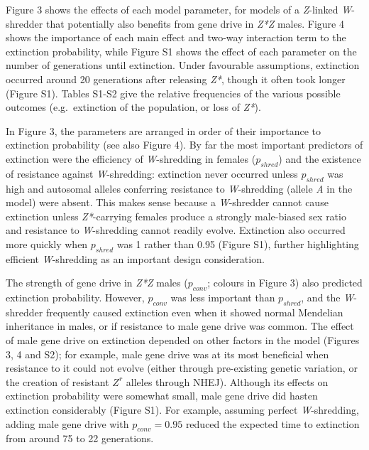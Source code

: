 \documentclass[]{rsos}%
\begin{document}
Figure 3 shows the effects of each model parameter, for models of a
\emph{Z}-linked \emph{W}-shredder that potentially also benefits from
gene drive in \emph{Z*Z} males. Figure 4 shows the importance of each
main effect and two-way interaction term to the extinction probability,
while Figure S1 shows the effect of each parameter on the number of
generations until extinction. Under favourable assumptions, extinction
occurred around 20 generations after releasing \emph{Z*}, though it
often took longer (Figure S1). Tables S1-S2 give the relative
frequencies of the various possible outcomes (e.g.~extinction of the
population, or loss of \emph{Z*}).

In Figure 3, the parameters are arranged in order of their importance to
extinction probability (see also Figure 4). By far the most important
predictors of extinction were the efficiency of \emph{W}-shredding in
females (\(p_{shred}\)) and the existence of resistance against
\emph{W}-shredding: extinction never occurred unless \(p_{shred}\) was
high and autosomal alleles conferring resistance to \emph{W}-shredding
(allele \emph{A} in the model) were absent. This makes sense because a
\emph{W}-shredder cannot cause extinction unless \emph{Z*}-carrying
females produce a strongly male-biased sex ratio and resistance to
\emph{W}-shredding cannot readily evolve. Extinction also occurred more
quickly when \(p_{shred}\) was 1 rather than 0.95 (Figure S1), further
highlighting efficient \emph{W}-shredding as an important design
consideration.

The strength of gene drive in \emph{Z*Z} males (\(p_{conv}\); colours in
Figure 3) also predicted extinction probability. However, \(p_{conv}\)
was less important than \(p_{shred}\), and the \emph{W}-shredder
frequently caused extinction even when it showed normal Mendelian
inheritance in males, or if resistance to male gene drive was common.
The effect of male gene drive on extinction depended on other factors in
the model (Figures 3, 4 and S2); for example, male gene drive was at its
most beneficial when resistance to it could not evolve (either through
pre-existing genetic variation, or the creation of resistant \(Z^r\)
alleles through NHEJ). Although its effects on extinction probability
were somewhat small, male gene drive did hasten extinction considerably
(Figure S1). For example, assuming perfect \emph{W}-shredding, adding
male gene drive with \(p_{conv} = 0.95\) reduced the expected time to
extinction from around 75 to 22 generations.
\end{document}

